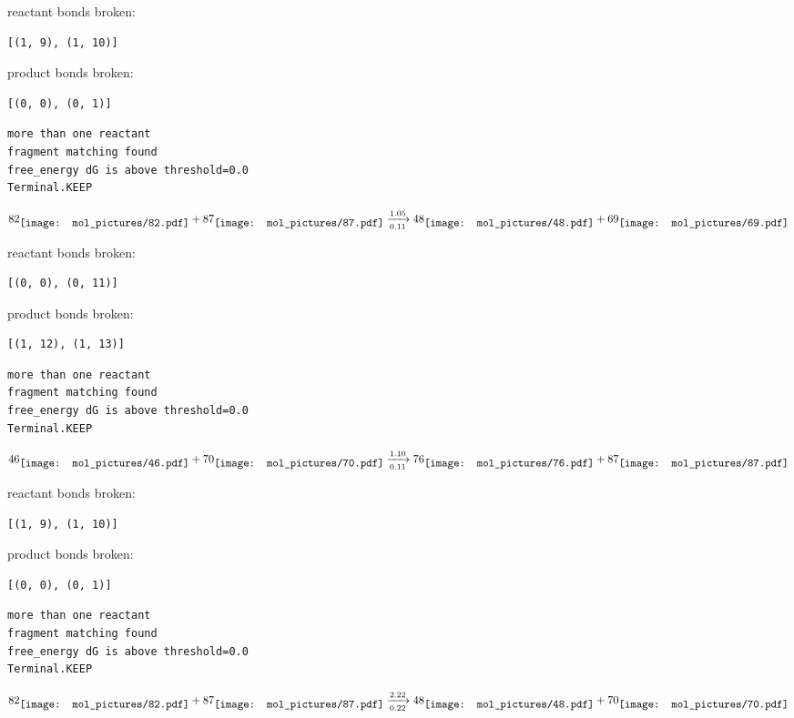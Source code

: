 \documentclass{article}
\begin{document}
reactant bonds broken:\begin{verbatim}
[(1, 9), (1, 10)]
\end{verbatim}
product bonds broken:\begin{verbatim}
[(0, 0), (0, 1)]
\end{verbatim}




\vspace{1cm}
\begin{verbatim}
more than one reactant
fragment matching found
free_energy dG is above threshold=0.0
Terminal.KEEP
\end{verbatim}
$$
82
\raisebox{-.5\height}{\texttt{[image: mol\_pictures/82.pdf]}}
+
87
\raisebox{-.5\height}{\texttt{[image: mol\_pictures/87.pdf]}}
\xrightarrow[0.11]{1.05}
48
\raisebox{-.5\height}{\texttt{[image: mol\_pictures/48.pdf]}}
+
69
\raisebox{-.5\height}{\texttt{[image: mol\_pictures/69.pdf]}}
$$


reactant bonds broken:\begin{verbatim}
[(0, 0), (0, 11)]
\end{verbatim}
product bonds broken:\begin{verbatim}
[(1, 12), (1, 13)]
\end{verbatim}




\vspace{1cm}
\begin{verbatim}
more than one reactant
fragment matching found
free_energy dG is above threshold=0.0
Terminal.KEEP
\end{verbatim}
$$
46
\raisebox{-.5\height}{\texttt{[image: mol\_pictures/46.pdf]}}
+
70
\raisebox{-.5\height}{\texttt{[image: mol\_pictures/70.pdf]}}
\xrightarrow[0.11]{1.10}
76
\raisebox{-.5\height}{\texttt{[image: mol\_pictures/76.pdf]}}
+
87
\raisebox{-.5\height}{\texttt{[image: mol\_pictures/87.pdf]}}
$$


reactant bonds broken:\begin{verbatim}
[(1, 9), (1, 10)]
\end{verbatim}
product bonds broken:\begin{verbatim}
[(0, 0), (0, 1)]
\end{verbatim}




\vspace{1cm}
\begin{verbatim}
more than one reactant
fragment matching found
free_energy dG is above threshold=0.0
Terminal.KEEP
\end{verbatim}
$$
82
\raisebox{-.5\height}{\texttt{[image: mol\_pictures/82.pdf]}}
+
87
\raisebox{-.5\height}{\texttt{[image: mol\_pictures/87.pdf]}}
\xrightarrow[0.22]{2.22}
48
\raisebox{-.5\height}{\texttt{[image: mol\_pictures/48.pdf]}}
+
70
\raisebox{-.5\height}{\texttt{[image: mol\_pictures/70.pdf]}}
$$
\end{document}
